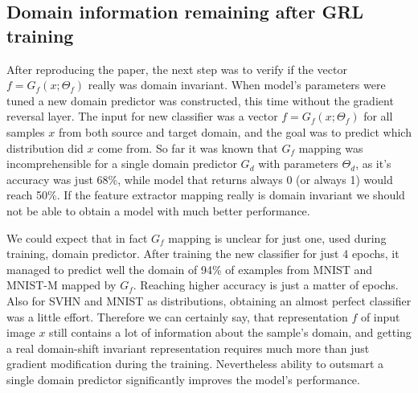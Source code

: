 \documentclass{article}
\begin{document}
\subsection{Domain information remaining after GRL training}
After reproducing the paper, the next step was to verify if the vector $f=G_{f}(x;\Theta_{f})$ really was domain invariant. When model's parameters were tuned a new domain predictor was constructed, this time without the gradient reversal layer. The input for new classifier was a vector $f = G_{f}(x;\Theta_{f})$ for all samples $x$ from both source and target domain, and the goal was to predict which distribution did $x$ come from. So far it was known that $G_{f}$ mapping was incomprehensible for a single domain predictor $G_{d}$ with parameters $\Theta_{d}$, as it's accuracy was just 68\%, while model that returns always 0 (or always 1) would reach 50\%. If the feature extractor mapping really is domain invariant we should not be able to obtain a model with much better performance.
\par
We could expect that in fact $G_{f}$ mapping is unclear for just one, used during training, domain predictor. After training the new classifier for just 4 epochs, it managed to predict well the domain of 94\% of examples from MNIST and MNIST-M mapped by $G_{f}$. Reaching higher accuracy is just a matter of epochs. Also for SVHN and MNIST as distributions, obtaining an almost perfect classifier was a little effort. Therefore we can certainly say, that representation $f$ of input image $x$ still contains a lot of information about the sample's domain, and getting a real domain-shift invariant representation requires much more than just gradient modification during the training. Nevertheless ability to outsmart a single domain predictor significantly improves the model's performance.
\end{document}
